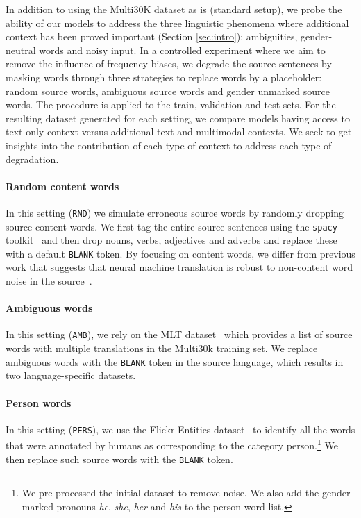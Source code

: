 \documentclass[11pt,a4paper]{article}
\newcommand{\rnd}{\texttt{RND}\xspace}
\newcommand{\amb}{\texttt{AMB}\xspace}
\newcommand{\pers}{\texttt{PERS}\xspace}
\begin{document}
In addition to using the Multi30K dataset as is (standard setup), we probe the ability of our models to address the three linguistic phenomena where additional context has been proved important (Section \ref{sec:intro}): ambiguities, gender-neutral words and noisy input. In a controlled experiment where we aim to remove the influence of frequency biases, we degrade the source sentences by masking words through three strategies to replace words by a placeholder: random source words, ambiguous source words and gender unmarked source words. The procedure is applied to the train, validation and test sets. For the resulting dataset generated for each setting, we compare  models having access to text-only context versus additional text and multimodal contexts. We seek to get insights into the contribution of each type of context to address each type of degradation.

\paragraph{Random content words}
In this setting (\rnd) we simulate erroneous source words by randomly dropping source content words. We first tag the entire source sentences using the \texttt{spacy} toolkit~\cite{honnibal2017spacy} and then drop nouns, verbs, adjectives and adverbs and replace these with a default \texttt{BLANK} token. By focusing on content words, we differ from previous work that suggests that neural machine translation is robust to non-content word noise in the source~\cite{klubivcka2017fine}. 

\paragraph{Ambiguous words}
In this setting (\amb), we rely on the MLT dataset~\cite{lala-EtAl:2018:WMT} which provides a list of source words with multiple translations in the Multi30k training set. We replace ambiguous words with the  \texttt{BLANK} token in the source language, which results in two language-specific datasets.

\paragraph{Person words} In this setting (\pers), we use the Flickr Entities dataset~\cite{plummer2015flickr30k} to identify all the words that were annotated by humans as corresponding to the category person.\footnote{We pre-processed the initial dataset to remove noise. We also add the gender-marked pronouns \emph{he}, \emph{she}, \emph{her} and \emph{his} to the person word list.} We then replace such source words with the  \texttt{BLANK} token.
\end{document}
